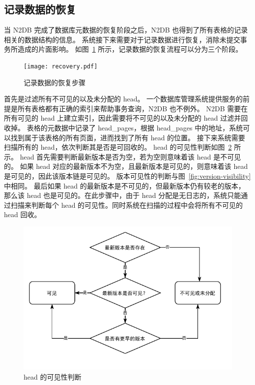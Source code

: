 \subsection{记录数据的恢复}
\label{ssec:record-recovery}

当 N2DB 完成了数据库元数据的恢复阶段之后，N2DB 也得到了所有表格的记录相关的数据结构的信息。
系统接下来需要对于记录数据进行恢复，消除未提交事务所造成的片面影响。
如图~\ref{fig:record-recovery} 所示，记录数据的恢复流程可以分为三个阶段。

\begin{figure}[ht]
    \centering
    \texttt{[image: recovery.pdf]}
    \caption{记录数据的恢复步骤}
    \label{fig:record-recovery}
\end{figure}

首先是过滤所有不可见的以及未分配的 head。
一个数据库管理系统提供服务的前提是所有表格都有正确的索引来帮助事务查询，N2DB 也不例外。
N2DB 需要在所有可见的 head 上建立索引，因此需要将不可见的以及未分配的 head 过滤并回收掉。
表格的元数据中记录了 head\_pages，根据 head\_pages 中的地址，系统可以找到属于该表格的所有页面，进而找到了所有 head 的位置。
接下来系统需要扫描所有的 head，依次判断其是否是可回收的。
head 的可见性判断如图~\ref{fig:head-visibility} 所示。
head 首先需要判断最新版本是否为空，若为空则意味着该 head 是不可见的。
如果 head 对应的最新版本不为空，且最新版本是可见的，则意味着该 head 是可见的，因此该版本链是可见的。
版本可见性的判断与图~\ref{fig:version-visibility} 中相同。
最后如果 head 的最新版本是不可见的，但最新版本仍有较老的版本，那么该 head 也是可见的。在此步骤中，由于 head 分配是无日志的，系统只能通过扫描来判断每个 head 的可见性。同时系统在扫描的过程中会将所有不可见的 head 回收。

\begin{figure}[ht]
    \centering
    \includegraphics[width=1\linewidth]{figures/head_visibility.pdf}
    \caption{head 的可见性判断}
    \label{fig:head-visibility}
\end{figure}

